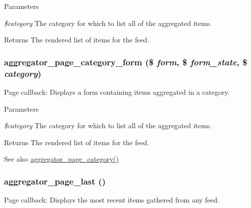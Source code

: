 \begin{DoxyParams}{Parameters}
\item[{\em \$category}]The category for which to list all of the aggregated items.\end{DoxyParams}
\begin{DoxyReturn}{Returns}
The rendered list of items for the feed. 
\end{DoxyReturn}
\hypertarget{aggregator_8pages_8inc_a089dc93129a06c24a1f455105121cb32}{
\subsubsection[{aggregator\_\-page\_\-category\_\-form}]{\setlength{\rightskip}{0pt plus 5cm}aggregator\_\-page\_\-category\_\-form (\$ {\em form}, \/  \$ {\em form\_\-state}, \/  \$ {\em category})}}
\label{aggregator_8pages_8inc_a089dc93129a06c24a1f455105121cb32}
Page callback: Displays a form containing items aggregated in a category.


\begin{DoxyParams}{Parameters}
\item[{\em \$category}]The category for which to list all of the aggregated items.\end{DoxyParams}
\begin{DoxyReturn}{Returns}
The rendered list of items for the feed.
\end{DoxyReturn}
\begin{DoxySeeAlso}{See also}
\hyperlink{aggregator_8pages_8inc_aaf7794d54e6d62be94efc636f9a39a4b}{aggregator\_\-page\_\-category()} 
\end{DoxySeeAlso}
\hypertarget{aggregator_8pages_8inc_a59d236d98e0725864c55ccf6f1ec7eab}{
\subsubsection[{aggregator\_\-page\_\-last}]{\setlength{\rightskip}{0pt plus 5cm}aggregator\_\-page\_\-last ()}}
\label{aggregator_8pages_8inc_a59d236d98e0725864c55ccf6f1ec7eab}
Page callback: Displays the most recent items gathered from any feed.

